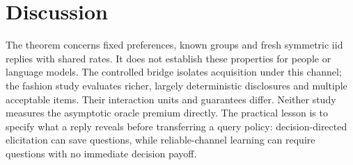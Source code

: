 \documentclass[sigconf,anonymous,review]{acmart}
\begin{document}
\section{Discussion}
The theorem concerns fixed preferences, known groups and fresh symmetric iid replies with shared rates. It does not establish these properties for people or language models. The controlled bridge isolates acquisition under this channel; the fashion study evaluates richer, largely deterministic disclosures and multiple acceptable items. Their interaction units and guarantees differ. Neither study measures the asymptotic oracle premium directly. The practical lesson is to specify what a reply reveals before transferring a query policy: decision-directed elicitation can save questions, while reliable-channel learning can require questions with no immediate decision payoff.


\end{document}
